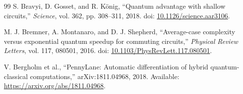 \begin{thebibliography}{99}
S. Bravyi, D. Gosset, and R. K\"onig, ``Quantum advantage with shallow circuits,'' \emph{Science}, vol. 362, pp. 308--311, 2018. doi: \href{https://doi.org/10.1126/science.aar3106}{10.1126/science.aar3106}.

M. J. Bremner, A. Montanaro, and D. J. Shepherd, ``Average-case complexity versus exponential quantum speedup for commuting circuits,'' \emph{Physical Review Letters}, vol. 117, 080501, 2016. doi: \href{https://doi.org/10.1103/PhysRevLett.117.080501}{10.1103/PhysRevLett.117.080501}.

V. Bergholm et al., ``PennyLane: Automatic differentiation of hybrid quantum-classical computations,'' arXiv:1811.04968, 2018. Available: \url{https://arxiv.org/abs/1811.04968}.
\end{thebibliography}
